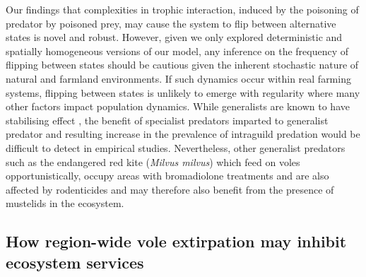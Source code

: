 \documentclass[11pt]{article}
\begin{document}
Our findings that complexities in trophic interaction, induced by the poisoning of predator by poisoned prey, may cause the system to flip between alternative states is novel and robust. However, given we only explored deterministic and spatially homogeneous versions of our model, any inference on the frequency of flipping between states should be cautious given the inherent stochastic nature of natural and farmland environments.
%
If such dynamics occur within real farming systems, flipping between states is unlikely to emerge with regularity where many other factors impact population dynamics. While generalists are known to have stabilising effect \citep{Hanski1991}, the benefit of specialist predators imparted to generalist predator and resulting increase in the prevalence of intraguild predation would be difficult to detect in empirical studies. Nevertheless, other generalist predators such as the endangered red kite (\textit{Milvus milvus}) which feed on voles opportunistically, occupy areas with bromadiolone treatments and are also affected by rodenticides \citep{Coeurdassier2014} and may therefore also benefit from the presence of mustelids in the ecosystem.

\subsection{How region-wide vole extirpation may inhibit ecosystem services}
\end{document}
